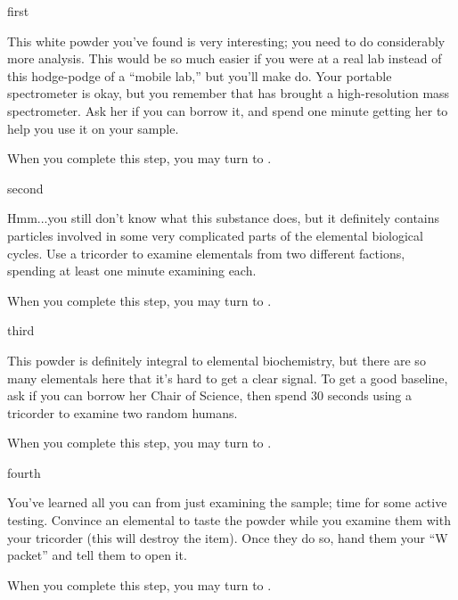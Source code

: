 \documentclass[notebook]{elementals}
\begin{document}

\startnotebook{\nWhiteResearch{}}

\begin{page}{first}

This white powder you've found is very interesting; you need to do considerably more analysis. This would be so much easier if you were at a real lab instead of this hodge-podge of a ``mobile lab,'' but you'll make do. Your portable spectrometer is okay, but you remember that \cGD{} has brought a high-resolution mass spectrometer. Ask her if you can borrow it, and spend one minute getting her to help you use it on your sample.

When you complete this step, you may turn to .

\end{page}

\begin{page}{second}

Hmm...you still don't know what this substance does, but it definitely contains particles involved in some very complicated parts of the elemental biological cycles. Use a tricorder to examine elementals from two different factions, spending at least one minute examining each.

When you complete this step, you may turn to .

\end{page}

\begin{page}{third}

This powder is definitely integral to elemental biochemistry, but there are so many elementals here that it's hard to get a clear signal. To get a good baseline, ask \cGD{} if you can borrow her Chair of Science, then spend 30 seconds using a tricorder to examine two random humans.

When you complete this step, you may turn to .

\end{page}

\begin{page}{fourth}

You've learned all you can from just examining the sample; time for some active testing. Convince an elemental to taste the powder while you examine them with your tricorder (this will destroy the item). Once they do so, hand them your ``W packet'' and tell them to open it.

When you complete this step, you may turn to .

\end{page}
\end{document}
